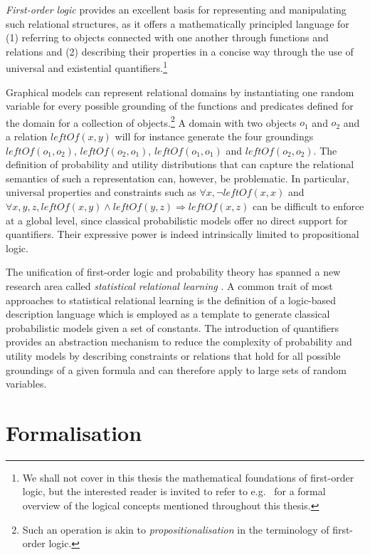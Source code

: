 \textit{First-order logic} provides an excellent basis for representing and manipulating such relational structures, as it offers a mathematically principled language for (1) referring to objects connected with one another through functions and relations and (2) describing their properties in a concise way through the use of universal and existential quantifiers.\footnote{We shall not cover in this thesis the mathematical foundations of first-order logic, but the interested reader is invited to refer to e.g.\ \cite{gamut1991logic} for a formal overview of the logical concepts mentioned throughout this thesis.}

Graphical models can represent relational domains by instantiating one random variable for every possible grounding of the functions and predicates defined for the domain for a collection of objects.\footnote{Such an operation is akin to \textit{propositionalisation} in the terminology of first-order logic.}  A domain with two objects $o_1$ and $o_2$ and a relation $\mathit{leftOf}(x,y)$ will for instance generate the four groundings $\mathit{leftOf}(o_1,o_2)$, $\mathit{leftOf}(o_2,o_1)$, $\mathit{leftOf}(o_1,o_1)$ and $\mathit{leftOf}(o_2,o_2)$. The definition of probability and utility distributions that can capture the relational semantics of such a representation can, however, be problematic. In particular, universal properties and constraints such as $\forall x, \neg \mathit{leftOf}(x,x)$ and $\forall x, y, z, \mathit{leftOf}(x,y) \land \mathit{leftOf}(y,z) \Rightarrow \mathit{leftOf}(x,z)$ can be difficult to enforce at a global level, since classical probabilistic models offer no direct support for quantifiers.  Their expressive power is indeed intrinsically limited to propositional logic. 
 
The unification of first-order logic and probability theory has spanned a new research area called \textit{statistical relational learning} \citep{getoor:srlbook07}. A common trait of most approaches to statistical relational learning is the definition of a logic-based description language which is employed as a template to generate classical probabilistic models given a set of constants. The introduction of quantifiers provides an abstraction mechanism to reduce the complexity of probability and utility models by describing constraints or relations that hold for all possible groundings of a given formula and can therefore apply to large sets of random variables. 

\section{Formalisation}
\label{sec:formalisation}

